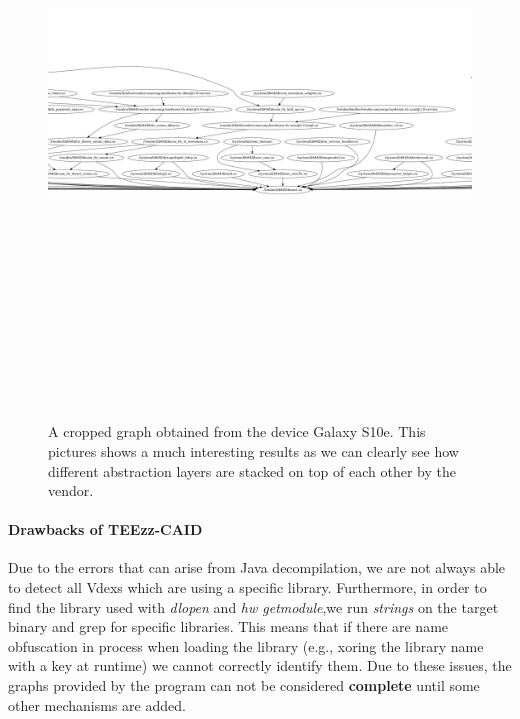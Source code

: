 \documentclass[a4paper,11pt,oneside]{article}
\begin{document}
\begin{figure}[!htb]
  \includegraphics[width=16cm, height=16cm]{figures/gs10e.png}
  \label{fig:gs10e}
  \caption{A cropped graph obtained from the device Galaxy S10e. This pictures shows a much interesting results as we can clearly see how different abstraction layers are stacked on top of each other by the vendor.}
\end{figure}
\paragraph{Drawbacks of TEEzz-CAID}
Due to the errors that can arise from Java decompilation, we are not always able to detect all Vdexs which are using a specific library. Furthermore, in order to find the library used with \emph{dlopen}
and \emph{hw \textunderscore get\textunderscore module},we run \emph{strings} on the target binary and grep for specific libraries. This means that if there are name obfuscation in process when loading the library (e.g., xoring the library name with a key at runtime) we cannot correctly identify them. Due to these issues, the graphs provided by the program can not be considered \textbf{complete} until some other mechanisms are added.
\end{document}
